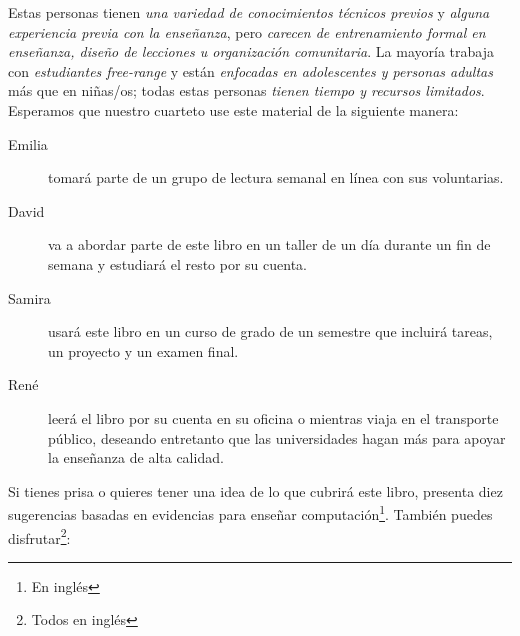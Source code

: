 Estas personas tienen \emph{una variedad de conocimientos técnicos previos}
y \emph{alguna experiencia previa con la enseñanza},
pero \emph{carecen de entrenamiento formal en enseñanza, diseño de lecciones u organización comunitaria}.
La mayoría trabaja con \emph{estudiantes free-range}
y están \emph{enfocadas en adolescentes y personas adultas}
más que en niñas/os;
todas estas personas \emph{tienen tiempo y recursos limitados}.
Esperamos que nuestro cuarteto use este material de la siguiente manera:

\begin{description}

\item[Emilia]
 tomará parte de un grupo de lectura semanal en línea con sus voluntarias.

\item[David]
 va a abordar parte de este libro en un taller de un día durante un fin de semana y estudiará el resto por su cuenta. 

\item[Samira]
 usará este libro en un curso de grado de un semestre que incluirá tareas, un proyecto y un examen final. 

\item[René]
 leerá el libro por su cuenta en su oficina o mientras viaja en el transporte público, deseando entretanto que las universidades hagan más para apoyar la enseñanza de alta calidad. 

\end{description}

Si tienes prisa o quieres tener una idea de lo que cubrirá este libro,
\cite{Brow2018} presenta diez sugerencias basadas en evidencias para enseñar computación\footnote{En inglés}.
También puedes disfrutar\footnote{Todos en inglés}:

